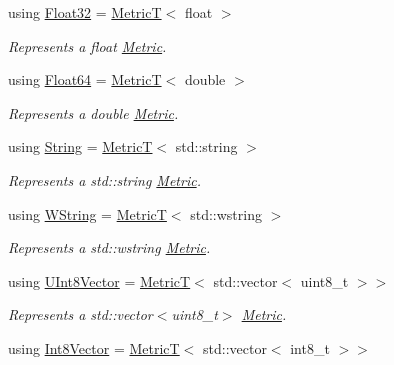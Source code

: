 \begin{DoxyCompactItemize}
using \hyperlink{group___process_metrics_gaee2fce12beb02ae0debbf3cefa36233c}{Float32} = \hyperlink{structdg_1_1deepcore_1_1_metric_t}{MetricT}$<$ float $>$
\begin{DoxyCompactList}\small\item\em Represents a {\ttfamily float} \hyperlink{classdg_1_1deepcore_1_1_metric}{Metric}. \end{DoxyCompactList}\item 
using \hyperlink{group___process_metrics_gaaab936172e4530d446a0701884c45462}{Float64} = \hyperlink{structdg_1_1deepcore_1_1_metric_t}{MetricT}$<$ double $>$
\begin{DoxyCompactList}\small\item\em Represents a {\ttfamily double} \hyperlink{classdg_1_1deepcore_1_1_metric}{Metric}. \end{DoxyCompactList}\item 
using \hyperlink{group___process_metrics_ga0b257f8c37ca91b205247869b5551dfc}{String} = \hyperlink{structdg_1_1deepcore_1_1_metric_t}{MetricT}$<$ std\+::string $>$
\begin{DoxyCompactList}\small\item\em Represents a {\ttfamily std\+::string} \hyperlink{classdg_1_1deepcore_1_1_metric}{Metric}. \end{DoxyCompactList}\item 
using \hyperlink{group___process_metrics_gab5555b62cbb470dbeed23c40147b9e06}{W\+String} = \hyperlink{structdg_1_1deepcore_1_1_metric_t}{MetricT}$<$ std\+::wstring $>$
\begin{DoxyCompactList}\small\item\em Represents a {\ttfamily std\+::wstring} \hyperlink{classdg_1_1deepcore_1_1_metric}{Metric}. \end{DoxyCompactList}\item 
using \hyperlink{group___process_metrics_gadf575847656bb4166faff7d30306d1f9}{U\+Int8\+Vector} = \hyperlink{structdg_1_1deepcore_1_1_metric_t}{MetricT}$<$ std\+::vector$<$ uint8\+\_\+t $>$$>$
\begin{DoxyCompactList}\small\item\em Represents a {\ttfamily std\+::vector$<$uint8\+\_\+t$>$} \hyperlink{classdg_1_1deepcore_1_1_metric}{Metric}. \end{DoxyCompactList}\item 
using \hyperlink{group___process_metrics_gacb7db62769772226cbad4d2d10b790f5}{Int8\+Vector} = \hyperlink{structdg_1_1deepcore_1_1_metric_t}{MetricT}$<$ std\+::vector$<$ int8\+\_\+t $>$$>$

\end{DoxyCompactItemize}
